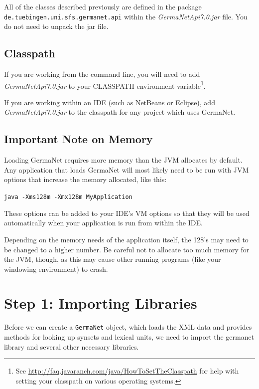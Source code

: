 \documentclass[12pt,a4paper,english,utf8]{report}
\begin{document}
All of the classes described previously are defined in the package \\ \texttt{de.tuebingen.uni.sfs.germanet.api} within the \emph{GermaNetApi7.0.jar} file. You do not need to unpack the jar file.



\subsection{Classpath}
If you are working from the command line, you will need to add \\ \emph{GermaNetApi7.0.jar} to your CLASSPATH environment variable\footnote{See \href{http://faq.javaranch.com/java/HowToSetTheClasspath}{http://faq.javaranch.com/java/HowToSetTheClasspath} for help with setting your classpath on various operating systems.}.

If you are working within an IDE (such as NetBeans or Eclipse), add \emph{GermaNetApi7.0.jar} to the classpath for any project which uses GermaNet.



\subsection{Important Note on Memory}
Loading GermaNet requires more memory than the JVM allocates by default. Any application that loads GermaNet will most likely need to be run with JVM options that increase the memory allocated, like this:

\texttt{java -Xms128m -Xmx128m MyApplication}

These options can be added to your IDE's VM options so that they will be used automatically when your application is run from within the IDE.

Depending on the memory needs of the application itself, the 128's may need to be changed to a higher number. Be careful not to allocate too much memory for the JVM, though, as this may cause other running programs (like your windowing environment) to crash.



\section{Step 1: Importing Libraries}
Before we can create a \texttt{GermaNet} object, which loads the XML data and provides methods for looking up synsets and lexical units, we need to import the germanet library and several other necessary libraries.
\end{document}
